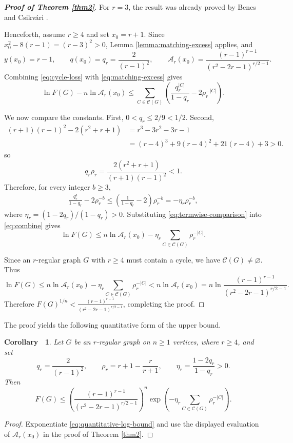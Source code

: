 \documentclass[11pt, a4paper]{article}
\theoremstyle{plain}
\newtheorem{corollary}{Corollary\ }[section]
\newenvironment{proofthm}[1]
{\begin{proof}[\textbf{#1}]}
{\end{proof}}
\begin{document}
\begin{proofthm}{Proof of Theorem \ref{thm2}}
For $r=3$, the result was already proved by Bencs and Csikvári \cite{Bencs2023}.

Henceforth, assume $r\geq4$ and set $x_0=r+1$.
Since $x_0^2-8(r-1)=(r-3)^2>0$,
Lemma \ref{lemma:matching-excess} applies, and
\[
 y(x_0)=r-1, \qquad q(x_0)=q_r=\frac2{(r-1)^2},
 \qquad \mathcal{A}_r(x_0)=\frac{(r - 1)^{r-1}}{(r^2 - 2r - 1)^{r/2-1}}.
\]
Combining \eqref{eq:cycle-loss} with \eqref{eq:matching-excess} gives
\begin{equation}\label{eq:combine}
 \ln F(G)-n\ln \mathcal{A}_r(x_0)
 \leq\sum_{C\in\mathcal{C}(G)}
       \left(\frac{q_r^{|C|}}{1-q_r}-2\rho_r^{-|C|}\right).
\end{equation}

We now compare the constants.
First, $0<q_r\leq2/9<1/2$.
Second,
\begin{align*}
 (r+1)(r-1)^2-2(r^2+r+1)
 &=r^3-3r^2-3r-1\\
 &=(r-4)^3+9(r-4)^2+21(r-4)+3>0.
\end{align*}
so
\[
 q_r\rho_r
 =\frac{2(r^2+r+1)}{(r+1)(r-1)^2}<1.
\]
Therefore, for every integer $b\geq3$,
\begin{align}
 \frac{q_r^b}{1-q_r}-2\rho_r^{-b}
 \leq\left(\frac1{1-q_r}-2\right)\rho_r^{-b}
 =-\eta_r \rho_r^{-b}, \label{eq:termwise-comparison}
\end{align}
where $\eta_r=(1-2q_r)/(1-q_r)>0$.
Substituting \eqref{eq:termwise-comparison} into \eqref{eq:combine} gives
\begin{equation}\label{eq:quantitative-log-bound}
 \ln F(G)\leq n\ln \mathcal{A}_r(x_0)
       -\eta_r\sum_{C\in\mathcal{C}(G)}\rho_r^{-|C|}.
\end{equation}


Since an $r$-regular graph $G$ with $r\geq4$ must contain a cycle, we have $\mathcal{C}(G)\neq\varnothing$.
Thus
\[
 \ln F(G)\leq n\ln \mathcal{A}_r(x_0)
       -\eta_r\sum_{C\in\mathcal{C}(G)}\rho_r^{-|C|}
       <n\ln \mathcal{A}_r(x_0)
       =n\ln \frac{(r - 1)^{r-1}}{(r^2 - 2r - 1)^{r/2-1}}.
\]
Therefore $F(G)^{1/n}<\frac{(r - 1)^{r-1}}{(r^2 - 2r - 1)^{r/2-1}}$,
completing the proof.
\end{proofthm}


The proof yields the following quantitative form of the upper bound.
\begin{corollary}\label{cor:cycle-correction}
Let $G$ be an $r$-regular graph on $n\geq1$ vertices, where $r\geq4$, and set
\[
q_r=\frac{2}{(r-1)^2},\qquad
\rho_r=r+1-\frac{r}{r+1},\qquad
\eta_r=\frac{1-2q_r}{1-q_r}>0.
\]
Then
\[
F(G)\leq
\left(\frac{(r-1)^{r-1}}{(r^2-2r-1)^{r/2-1}}\right)^n
\exp\!\left(-\eta_r\sum_{C\in\mathcal{C}(G)}\rho_r^{-|C|}\right).
\]
\end{corollary}
\begin{proof}
Exponentiate \eqref{eq:quantitative-log-bound} and use the displayed evaluation of $\mathcal{A}_r(x_0)$ in the proof of Theorem \ref{thm2}.
\end{proof}
\end{document}
